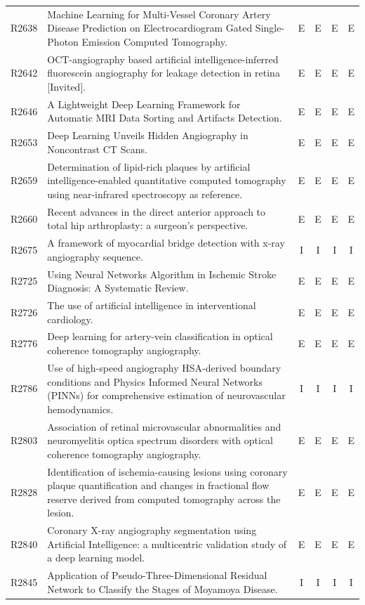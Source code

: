 \begin{longtable}{@{}l p{8.6cm} c c c c@{}}
R2638 & Machine Learning for Multi-Vessel Coronary Artery Disease Prediction on Electrocardiogram Gated Single-Photon Emission Computed Tomography. & E & E & E & E \\
R2642 & OCT-angiography based artificial intelligence-inferred fluorescein angiography for leakage detection in retina [Invited]. & E & E & E & E \\
R2646 & A Lightweight Deep Learning Framework for Automatic MRI Data Sorting and Artifacts Detection. & E & E & E & E \\
R2653 & Deep Learning Unveils Hidden Angiography in Noncontrast CT Scans. & E & E & E & E \\
R2659 & Determination of lipid-rich plaques by artificial intelligence-enabled quantitative computed tomography using near-infrared spectroscopy as reference. & E & E & E & E \\
R2660 & Recent advances in the direct anterior approach to total hip arthroplasty: a surgeon's perspective. & E & E & E & E \\
R2675 & A framework of myocardial bridge detection with x-ray angiography sequence. & I & I & I & I \\
R2725 & Using Neural Networks Algorithm in Ischemic Stroke Diagnosis: A Systematic Review. & E & E & E & E \\
R2726 & The use of artificial intelligence in interventional cardiology. & E & E & E & E \\
R2776 & Deep learning for artery-vein classification in optical coherence tomography angiography. & E & E & E & E \\
R2786 & Use of high-speed angiography HSA-derived boundary conditions and Physics Informed Neural Networks (PINNs) for comprehensive estimation of neurovascular hemodynamics. & I & I & I & I \\
R2803 & Association of retinal microvascular abnormalities and neuromyelitis optica spectrum disorders with optical coherence tomography angiography. & E & E & E & E \\
R2828 & Identification of ischemia-causing lesions using coronary plaque quantification and changes in fractional flow reserve derived from computed tomography across the lesion. & E & E & E & E \\
R2840 & Coronary X-ray angiography segmentation using Artificial Intelligence: a multicentric validation study of a deep learning model. & E & E & E & E \\
R2845 & Application of Pseudo-Three-Dimensional Residual Network to Classify the Stages of Moyamoya Disease. & I & I & I & I \\

\end{longtable}
